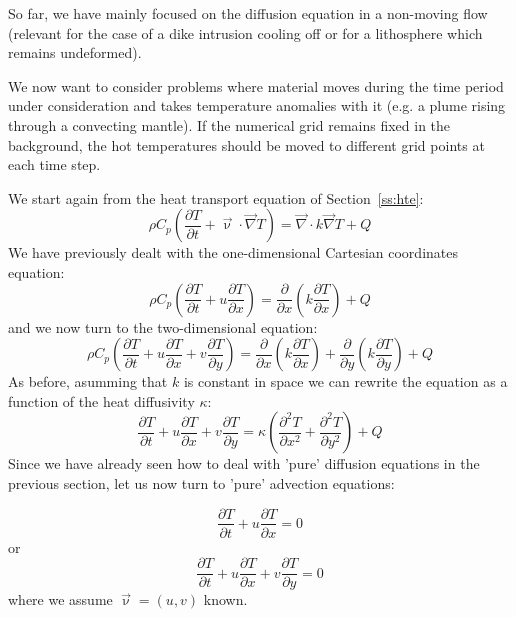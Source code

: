 
So far, we have mainly focused on the diffusion equation in a non-moving flow 
(relevant for the case of a dike intrusion cooling off 
or for a lithosphere which remains undeformed). 

We now want to consider problems where material moves during the time period under 
consideration and takes temperature anomalies with it (e.g. a plume rising 
through a convecting mantle). 
If the numerical grid remains fixed in the background, the hot temperatures should 
be moved to different grid points at each time step. 

We start again from the heat transport equation of Section~\ref{ss:hte}:
\begin{equation}
\rho C_p \left( \frac{\partial T}{\partial t} + \vec\upnu \cdot \vec\nabla T  \right)=
\vec\nabla \cdot k \vec\nabla T + Q 
\end{equation}
We have previously dealt with the one-dimensional Cartesian coordinates equation:
\begin{equation}
\rho C_p \left( \frac{\partial T}{\partial t}  
+ u \frac{\partial T}{\partial x} \right)= 
\frac{\partial }{\partial x} \left(  k  \frac{\partial T}{\partial x} \right)+ Q
\end{equation}
and we now turn to the two-dimensional equation:
\begin{equation}
\rho C_p \left( \frac{\partial T}{\partial t}   
+ u \frac{\partial T}{\partial x}  
+ v \frac{\partial T}{\partial y} \right) 
=
\frac{\partial }{\partial x} \left(  k  \frac{\partial T}{\partial x} \right)
+
\frac{\partial }{\partial y} \left(  k  \frac{\partial T}{\partial y} \right)
+Q
\end{equation}
As before, asumming that $k$ is constant in space we can rewrite the equation as 
a function of the heat diffusivity $\kappa$:
\begin{equation}
\frac{\partial T}{\partial t}   
+ u \frac{\partial T}{\partial x}  
+ v \frac{\partial T}{\partial y} 
=
\kappa \left( 
\frac{\partial^2 T}{\partial x^2} 
+ \frac{\partial^2 T}{\partial y^2} \right) +Q
\end{equation}
Since we have already seen how to deal with 'pure' diffusion equations in the 
previous section, let us now turn to 'pure' advection equations:

\begin{equation}
\frac{\partial T}{\partial t}  + u \frac{\partial T}{\partial x} = 0
\end{equation}
or
\begin{equation}
\frac{\partial T}{\partial t}  + u \frac{\partial T}{\partial x} + v \frac{\partial T}{\partial y}= 0
\end{equation}
where we assume $\vec\upnu=(u,v)$ known. 

